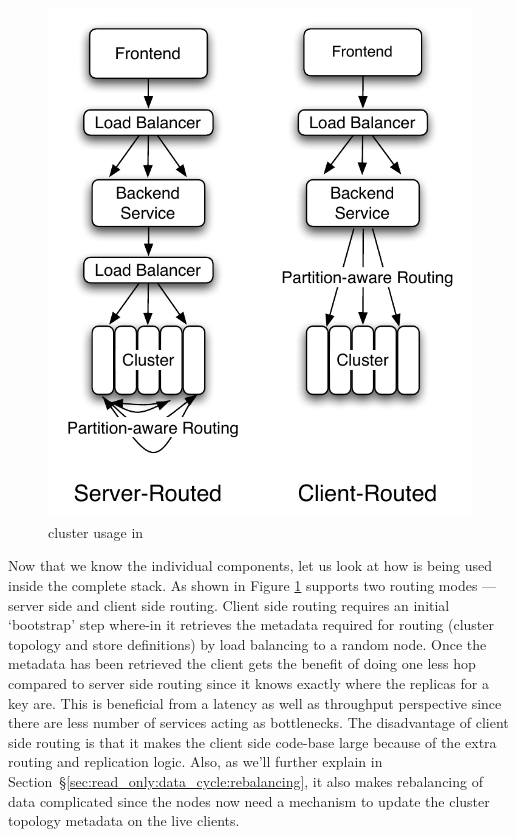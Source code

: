 \begin{figure}
  \centering
    \includegraphics[scale=0.45]{images/fullstack.pdf}
  \caption{\projectname{} cluster usage in \linkedin{}}
  \label{fullstack}
\end{figure}


\noindent 
Now that we know the individual components, let us look at how \projectname{} is being used inside the complete \linkedin{} stack. As shown in Figure \ref{fullstack} \projectname{} supports two routing modes --- server side and client side routing. Client side routing requires an initial `bootstrap' step where-in it retrieves the metadata required for routing (cluster topology and store definitions) by load balancing to a random node. Once the metadata has been retrieved the client gets the benefit of doing one less hop compared to server side routing since it knows exactly where the replicas for a key are. This is beneficial from a latency as well as throughput perspective since there are less number of services acting as bottlenecks. The disadvantage of client side routing is that it makes the client side code-base large because of the extra routing and replication logic. Also, as we'll further explain in Section~\S\ref{sec:read_only:data_cycle:rebalancing}, it also makes rebalancing of data complicated since the \projectname{} nodes now need a mechanism to update the cluster topology metadata on the live clients. 



